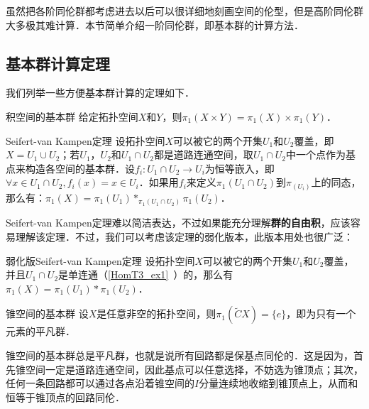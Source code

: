 


虽然把各阶同伦群都考虑进去以后可以很详细地刻画空间的伦型，但是高阶同伦群大多极其难计算．本节简单介绍一阶同伦群，即基本群的计算方法．

\subsection{基本群计算定理}

我们列举一些方便基本群计算的定理如下．

\begin{theorem}{积空间的基本群}
给定拓扑空间$X$和$Y$，则$\pi_1(X\times Y)=\pi_1(X)\times\pi_1(Y)$．
\end{theorem}

\begin{theorem}{Seifert-van Kampen定理}
设拓扑空间$X$可以被它的两个开集$U_1$和$U_2$覆盖，即$X=U_1\cup U_2$；若$U_1$，$U_2$和$U_1\cap U_2$都是道路连通空间，取$U_1\cap U_2$中一个点作为基点来构造各空间的基本群．设$f_i:U_1\cap U_2\rightarrow U_i$为恒等嵌入，即$\forall x\in U_1\cap U_2, f_i(x)=x\in U_i$．如果用$f_i$来定义$\pi_1(U_1\cap U_2)$到$\pi_(U_i)$上的同态，那么有：$\pi_1(X)=\pi_1(U_1)*_{\pi_1(U_1\cap U_2)}\pi_1(U_2)$．
\end{theorem}

Seifert-van Kampen定理难以简洁表达，不过如果能充分理解\textbf{群的自由积}，应该容易理解该定理．不过，我们可以考虑该定理的弱化版本，此版本用处也很广泛：

\begin{theorem}{弱化版Seifert-van Kampen定理}
设拓扑空间$X$可以被它的两个开集$U_1$和$U_2$覆盖，并且$U_1\cap U_2$是单连通（\autoref{HomT3_ex1}~）的，那么有$\pi_1(X)=\pi_1(U_1)*\pi_1(U_2)$．
\end{theorem}

\begin{theorem}{锥空间的基本群}
设$X$是任意非空的拓扑空间，则$\pi_1(\widetilde{C}X)=\{e\}$，即为只有一个元素的平凡群．
\end{theorem}

锥空间的基本群总是平凡群，也就是说所有回路都是保基点同伦的．这是因为，首先锥空间一定是道路连通空间，因此基点可以任意选择，不妨选为锥顶点；其次，任何一条回路都可以通过各点沿着锥空间的$I$分量连续地收缩到锥顶点上，从而和恒等于锥顶点的回路同伦．



